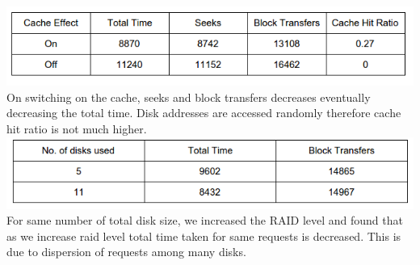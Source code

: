 \documentclass[11pt]{article}
\begin{document}
\includegraphics[scale = 0.60]{images/table2.png}\\

On switching on the cache, seeks and block transfers decreases eventually decreasing the total time. Disk addresses are accessed randomly therefore cache hit ratio is not much higher. 
\includegraphics[scale = 0.60]{images/table3.png}\\

For same number of total disk size, we increased the RAID level and found that as we increase raid level total time taken for same requests is decreased. This is due to dispersion of requests among many disks.
\end{document}
